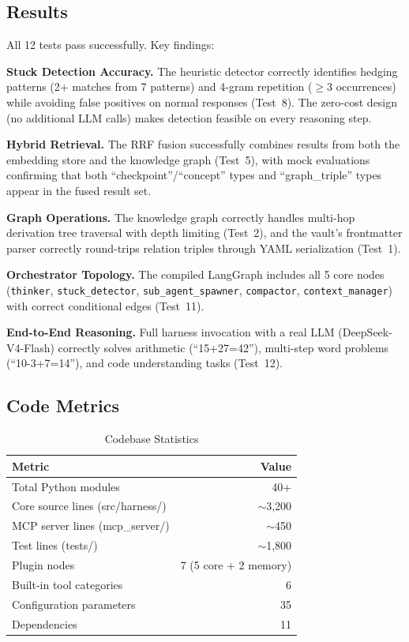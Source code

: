 \documentclass[conference]{IEEEtran}
\begin{document}
\subsection{Results}

All 12 tests pass successfully. Key findings:

\textbf{Stuck Detection Accuracy.} The heuristic detector correctly identifies hedging patterns (2+ matches from 7 patterns) and 4-gram repetition ($\geq 3$ occurrences) while avoiding false positives on normal responses (Test~8). The zero-cost design (no additional LLM calls) makes detection feasible on every reasoning step.

\textbf{Hybrid Retrieval.} The RRF fusion successfully combines results from both the embedding store and the knowledge graph (Test~5), with mock evaluations confirming that both ``checkpoint''/``concept'' types and ``graph\_triple'' types appear in the fused result set.

\textbf{Graph Operations.} The knowledge graph correctly handles multi-hop derivation tree traversal with depth limiting (Test~2), and the vault's frontmatter parser correctly round-trips relation triples through YAML serialization (Test~1).

\textbf{Orchestrator Topology.} The compiled LangGraph includes all 5 core nodes (\texttt{thinker}, \texttt{stuck\_detector}, \texttt{sub\_agent\_spawner}, \texttt{compactor}, \texttt{context\_manager}) with correct conditional edges (Test~11).

\textbf{End-to-End Reasoning.} Full harness invocation with a real LLM (DeepSeek-V4-Flash) correctly solves arithmetic (``15+27=42''), multi-step word problems (``10-3+7=14''), and code understanding tasks (Test~12).

\subsection{Code Metrics}

\begin{table}[htbp]
\caption{Codebase Statistics}
\label{tab:codemetrics}
\centering
\footnotesize
\begin{tabular}{@{}lr@{}}
\toprule
\textbf{Metric} & \textbf{Value} \\
\midrule
Total Python modules & 40+ \\
Core source lines (src/harness/) & $\sim$3,200 \\
MCP server lines (mcp\_server/) & $\sim$450 \\
Test lines (tests/) & $\sim$1,800 \\
Plugin nodes & 7 (5 core + 2 memory) \\
Built-in tool categories & 6 \\
Configuration parameters & 35 \\
Dependencies & 11 \\
\bottomrule
\end{tabular}
\end{table}
\end{document}
